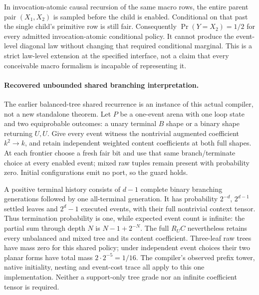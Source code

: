 \documentclass[11pt]{article}
\begin{document}
In invocation-atomic causal recursion of the same macro rows, the entire parent pair $(X_1,X_2)$ is sampled before the child is enabled. Conditional on that past the single child's primitive row is still fair. Consequently $\Pr(Y=X_2)=1/2$ for every admitted invocation-atomic conditional policy. It cannot produce the event-level diagonal law without changing that required conditional marginal. This is a strict law-level extension at the specified interface, not a claim that every conceivable macro formalism is incapable of representing it.

\paragraph{Recovered unbounded shared branching interpretation.}
The earlier balanced-tree shared recurrence is an instance of this actual compiler, not a new standalone theorem. Let $P$ be a one-event arena with one loop state and two equiprobable outcomes: a unary terminal $B$ shape or a binary shape returning $U,U$. Give every event witness the nontrivial augmented coefficient $k^2\to k$, and retain independent weighted content coefficients at both full shapes. At each frontier choose a fresh fair bit and use that same branch/terminate choice at every enabled event; mixed raw tuples remain present with probability zero. Initial configurations emit no port, so the guard holds.

A positive terminal history consists of $d-1$ complete binary branching generations followed by one all-terminal generation. It has probability $2^{-d}$, $2^{d-1}$ settled leaves and $2^d-1$ executed events, with their full nontrivial context tensor. Thus termination probability is one, while expected event count is infinite: the partial sum through depth $N$ is $N-1+2^{-N}$. The full $R_UC$ nevertheless retains every unbalanced and mixed tree and its content coefficient. Three-leaf raw trees have mass zero for this shared policy; under independent event choices their two planar forms have total mass $2\cdot2^{-5}=1/16$. The compiler's observed prefix tower, native initiality, nesting and event-cost trace all apply to this one implementation. Neither a support-only tree grade nor an infinite coefficient tensor is required.
\end{document}

